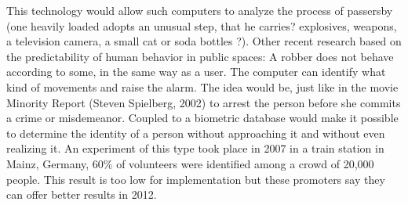 This technology would allow such computers to analyze the process of passersby (one heavily loaded adopts an unusual step, that he carries? explosives, weapons, a television camera, a small cat or soda bottles ?). Other recent research based on the predictability of human behavior in public spaces: A robber does not behave according to some, in the same way as a user. The computer can identify what kind of movements and raise the alarm. The idea would be, just like in the movie Minority Report (Steven Spielberg, 2002) to arrest the person before she commits a crime or misdemeanor.
Coupled to a biometric database would make it possible to determine the identity of a person without approaching it and without even realizing it. An experiment of this type took place in 2007 in a train station in Mainz, Germany, 60\% of volunteers were identified among a crowd of 20,000 people. This result is too low for implementation but these promoters say they can offer better results in 2012.
